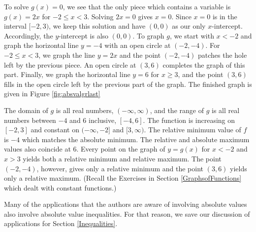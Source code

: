 {To solve $g(x)=0$, we see that the only piece which contains a variable is $g(x) = 2x$ for $-2 \leq x < 3$.  Solving $2x=0$ gives $x=0$.  Since $x=0$ is in the interval $[-2,3)$, we keep this solution and have $(0,0)$ as our only $x$-intercept.  Accordingly, the $y$-intercept is also $(0,0)$.  To graph $g$, we start with $x < -2$ and graph the horizontal line $y=-4$ with an open circle  at $(-2,-4)$. For $-2 \leq x < 3$, we graph the line $y=2x$ and the point $(-2,-4)$ patches the hole left by the previous piece.  An open circle at $(3,6)$ completes the graph of this part.  Finally, we graph the horizontal line $y=6$ for $x \geq 3$, and the point $(3,6)$ fills in the open circle left by the previous part of the graph.  The finished graph is given in Figure \ref{fig:absvalgrlast}


The domain of $g$ is all real numbers, $(-\infty, \infty)$, and the range of $g$ is all real numbers between $-4$ and $6$ inclusive, $[-4,6]$.  The function is increasing on $[-2,3]$ and constant on $(-\infty, -2]$ and $[3,\infty)$.  The relative minimum value of $f$ is $-4$ which matches the absolute minimum.  The relative and absolute maximum values also coincide at $6$.  Every point on the graph of $y=g(x)$ for $x<-2$ and $x> 3$ yields both a relative minimum and relative maximum.  The point $(-2,-4)$, however, gives only a relative minimum and the point $(3,6)$ yields only a relative maximum.  (Recall the Exercises in Section \ref{GraphsofFunctions} which dealt with constant functions.)
}

\medskip

Many of the applications that the authors are aware of involving absolute values also involve absolute value inequalities.  For that reason, we save our discussion of applications for Section \ref{Inequalities}.

